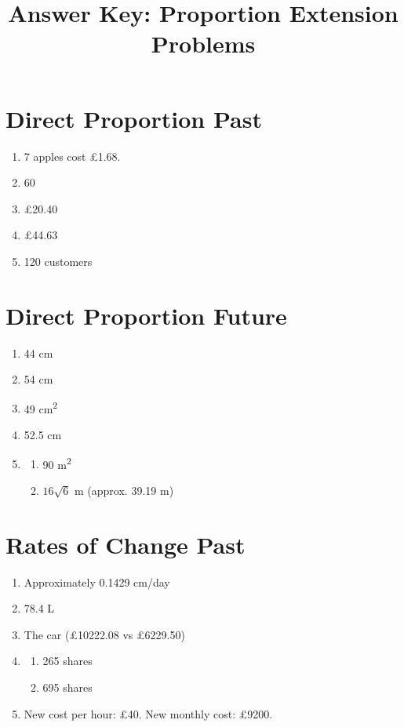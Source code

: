 \documentclass[12pt]{article}
\title{Answer Key: Proportion Extension Problems}
\date{}
\begin{document}
\maketitle

\section*{Direct Proportion Past}
\begin{enumerate}
    \item 7 apples cost £1.68.
    \item 60
    \item £20.40
    \item £44.63
    \item 120 customers
\end{enumerate}

\section*{Direct Proportion Future}
\begin{enumerate}[resume]
    \item 44 cm
    \item 54 cm
    \item 49 cm\textsuperscript{2}
    \item 52.5 cm
    \item \begin{enumerate}[label=(\alph*)]
        \item 90 m\textsuperscript{2}
        \item \(16\sqrt{6}\) m (approx. 39.19 m)
    \end{enumerate}
\end{enumerate}

\section*{Rates of Change Past}
\begin{enumerate}[resume]
    \item Approximately 0.1429 cm/day
    \item 78.4 L
    \item The car (£10222.08 vs £6229.50)
    \item \begin{enumerate}
        \item 265 shares
        \item 695 shares
    \end{enumerate}
    \item New cost per hour: £40. New monthly cost: £9200.
\end{enumerate}
\end{document}
